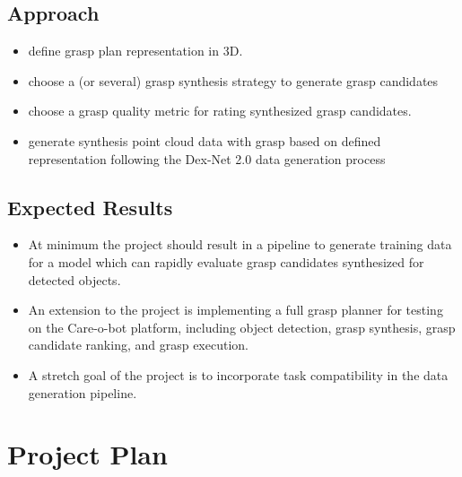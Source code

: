 \documentclass[12pt]{article}
\begin{document}
    \subsection{Approach}
    \begin{itemize}
        \item define grasp plan representation in 3D.
        \item choose a (or several) grasp synthesis strategy to generate grasp candidates
        \item choose a grasp quality metric for rating synthesized grasp candidates.
        \item generate synthesis point cloud data with grasp based on defined representation following the Dex-Net 2.0 data generation process \cite{mahler2017}
    \end{itemize}

    \subsection{Expected Results}
    \begin{itemize}
    	\item At minimum the project should result in a pipeline to generate training data for a model which can rapidly evaluate grasp candidates synthesized for detected objects.
    	\item An extension to the project is implementing a full grasp planner for testing on the Care-o-bot platform, including object detection, grasp synthesis, grasp candidate ranking, and grasp execution.
    	\item A stretch goal of the project is to incorporate task compatibility in the data generation pipeline.
    \end{itemize}


\section{Project Plan}

\end{document}
